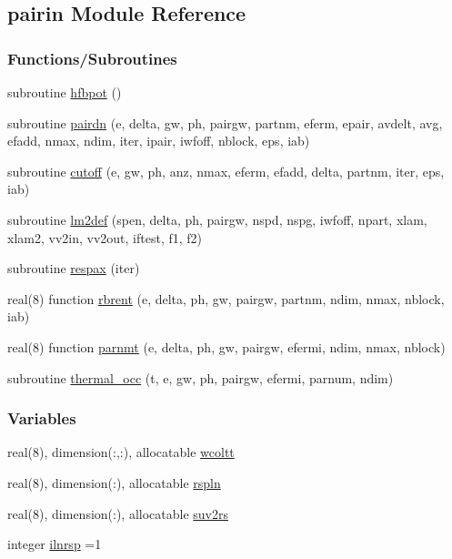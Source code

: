 \hypertarget{namespacepairin}{}\subsection{pairin Module Reference}
\label{namespacepairin}
\subsubsection*{Functions/\+Subroutines}
\begin{DoxyCompactItemize}
\item 
subroutine \hyperlink{namespacepairin_a6ce2e07b5ba93f003706e2458674f7dc}{hfbpot} ()
\item 
subroutine \hyperlink{namespacepairin_a667237dace8029f85c201bd33dbb0307}{pairdn} (e, delta, gw, ph, pairgw, partnm, eferm, epair, avdelt, avg, efadd, nmax, ndim, iter, ipair, iwfoff, nblock, eps, iab)
\item 
subroutine \hyperlink{namespacepairin_a28899d1f01ffe00a01d0c686ddeb4243}{cutoff} (e, gw, ph, anz, nmax, eferm, efadd, delta, partnm, iter, eps, iab)
\item 
subroutine \hyperlink{namespacepairin_af4e7513dca082d2c4128a1c638c6540c}{lm2def} (spen, delta, ph, pairgw, nspd, nspg, iwfoff, npart, xlam, xlam2, vv2in, vv2out, iftest, f1, f2)
\item 
subroutine \hyperlink{namespacepairin_a7edcef81564650b6ee0d2aa1836e1559}{respax} (iter)
\item 
real(8) function \hyperlink{namespacepairin_aa8ca2b543b3207c7ba2de8c3d3ec6fe2}{rbrent} (e, delta, ph, gw, pairgw, partnm, ndim, nmax, nblock, iab)
\item 
real(8) function \hyperlink{namespacepairin_a06d24fef8597829abc91dd966f48c21e}{parnmt} (e, delta, ph, gw, pairgw, efermi, ndim, nmax, nblock)
\item 
subroutine \hyperlink{namespacepairin_ad59063b8706217edfe3bea2685433713}{thermal\+\_\+occ} (t, e, gw, ph, pairgw, efermi, parnum, ndim)
\end{DoxyCompactItemize}
\subsubsection*{Variables}
\begin{DoxyCompactItemize}
\item 
real(8), dimension(\+:,\+:), allocatable \hyperlink{namespacepairin_a91f1c5ea0d945e465f4a156dd5b59a06}{wcoltt}
\item 
real(8), dimension(\+:), allocatable \hyperlink{namespacepairin_acd8755c2a404fb12ebb6f7701675f293}{rspln}
\item 
real(8), dimension(\+:), allocatable \hyperlink{namespacepairin_a60a518945a929b696384f16087a9309b}{suv2rs}
\item 
integer \hyperlink{namespacepairin_aad65b9e00f967e394d6c6abb1d8aeeea}{ilnrsp} =1
\end{DoxyCompactItemize}


